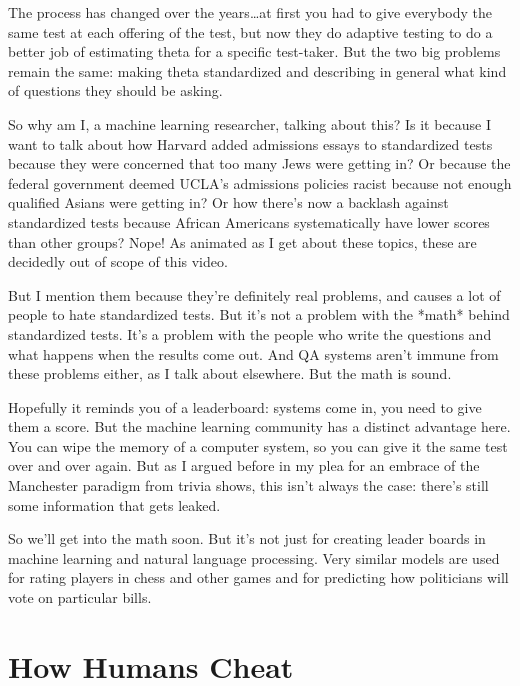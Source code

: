 The process has changed over the years\dots at first you had to give everybody
the same test at each offering of the test, but now they do adaptive testing
to do a better job of estimating theta for a specific test-taker.  But the two
big problems remain the same: making theta standardized and describing in
general what kind of questions they should be asking.


So why am I, a machine learning researcher, talking about this?  Is it because
I want to talk about how Harvard added admissions essays to standardized tests
because they were concerned that too many Jews were getting in?  Or because
the federal government deemed UCLA’s admissions policies racist because not
enough qualified Asians were getting in?  Or how there’s now a backlash
against standardized tests because African Americans systematically have lower
scores than other groups?  Nope!  As animated as I get about these topics,
these are decidedly out of scope of this video.

But I mention them because they’re definitely real problems, and causes a lot
of people to hate standardized tests.  But it’s not a problem with the *math*
behind standardized tests.  It’s a problem with the people who write the
questions and what happens when the results come out.  And QA systems aren’t
immune from these problems either, as I talk about elsewhere.  But the math is
sound.

Hopefully it reminds you of a leaderboard: systems come in, you need to give
them a score.  But the machine learning community has a distinct advantage
here.  You can wipe the memory of a computer system, so you can give it the
same test over and over again.  But as I argued before in my plea for an
embrace of the Manchester paradigm from trivia shows, this isn’t always the
case: there’s still some information that gets leaked.


So we’ll get into the math soon.  But it's not just for creating leader boards
in machine learning and natural language processing.  Very similar models are
used for rating players in chess and other games and for predicting how
politicians will vote on particular bills.

\section{How Humans Cheat}
\label{sec:leaderboards:cheat}



